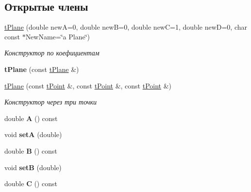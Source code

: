 \subsection*{Открытые члены}
\begin{DoxyCompactItemize}
\item 
\mbox{\label{classtPlane_a82b8ca291bcb680731ea06067267bfe3}} 
\hyperlink{classtPlane_a82b8ca291bcb680731ea06067267bfe3}{t\+Plane} (double newA=0, double newB=0, double newC=1, double newD=0, char const $\ast$New\+Name=\char`\"{}a Plane\char`\"{})
\begin{DoxyCompactList}\small\item\em Конструктор по коефициентам \end{DoxyCompactList}\item 
\mbox{\label{classtPlane_a18e2a0d542a83f8f250b70b9bda9c9c9}} 
{\bfseries t\+Plane} (const \hyperlink{classtPlane}{t\+Plane} \&)
\item 
\mbox{\label{classtPlane_a7232f7e46cd8e8ae4dfec128dd277b1f}} 
\hyperlink{classtPlane_a7232f7e46cd8e8ae4dfec128dd277b1f}{t\+Plane} (const \hyperlink{classtPoint}{t\+Point} \&, const \hyperlink{classtPoint}{t\+Point} \&, const \hyperlink{classtPoint}{t\+Point} \&)
\begin{DoxyCompactList}\small\item\em Конструктор через три точки \end{DoxyCompactList}\item 
\mbox{\label{classtPlane_a4ddac807c5347da56a1300b7fb7b577f}} 
double {\bfseries A} () const
\item 
\mbox{\label{classtPlane_a60ebb124c3ff083af76de458971844a6}} 
void {\bfseries setA} (double)
\item 
\mbox{\label{classtPlane_abf7d8f068035f46ca31c5da6566e7732}} 
double {\bfseries B} () const
\item 
\mbox{\label{classtPlane_ae6241f12630da93be209c38e1472119e}} 
void {\bfseries setB} (double)
\item 
\mbox{\label{classtPlane_ac2a72791a7336b7c56afe1f5d396c52b}} 
double {\bfseries C} () const

\end{DoxyCompactItemize}
